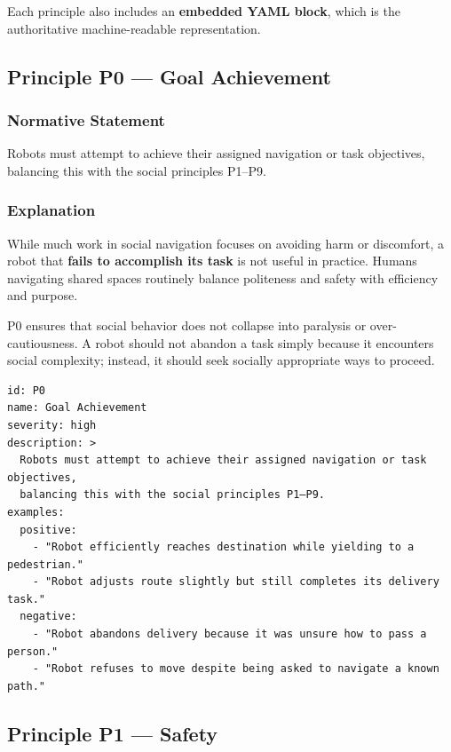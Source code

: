 \documentclass[utf8]{frontiers_suppmat} %
\begin{document}
Each principle also includes an \textbf{embedded YAML block}, which is
the authoritative machine-readable representation.

\subsection{Principle P0 --- Goal
Achievement}\label{principle-p0-goal-achievement}

\subsubsection{Normative Statement}\label{normative-statement}

Robots must attempt to achieve their assigned navigation or task
objectives, balancing this with the social principles P1--P9.

\subsubsection{Explanation}\label{explanation}

While much work in social navigation focuses on avoiding harm or
discomfort, a robot that \textbf{fails to accomplish its task} is not
useful in practice. Humans navigating shared spaces routinely balance
politeness and safety with efficiency and purpose.

P0 ensures that social behavior does not collapse into paralysis or
over-cautiousness. A robot should not abandon a task simply because it
encounters social complexity; instead, it should seek socially
appropriate ways to proceed.

\begin{lstlisting}[style=literatecard]
id: P0
name: Goal Achievement
severity: high
description: >
  Robots must attempt to achieve their assigned navigation or task objectives,
  balancing this with the social principles P1–P9.
examples:
  positive:
    - "Robot efficiently reaches destination while yielding to a pedestrian."
    - "Robot adjusts route slightly but still completes its delivery task."
  negative:
    - "Robot abandons delivery because it was unsure how to pass a person."
    - "Robot refuses to move despite being asked to navigate a known path."
\end{lstlisting}

\subsection{Principle P1 --- Safety}\label{principle-p1-safety}
\end{document}
